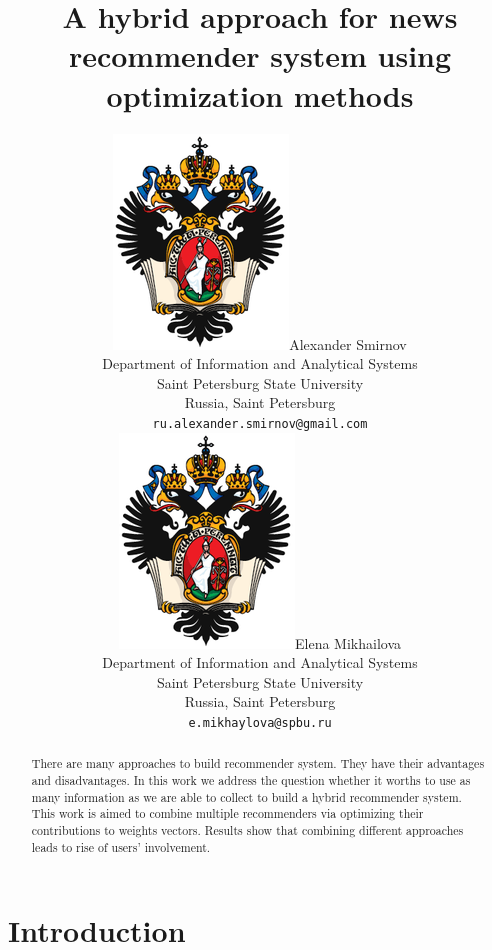 \documentclass{article}
\title{A hybrid approach for news recommender system using optimization methods}
\author{
    {\includegraphics[scale=0.07]{./images/spbu.png}\hspace{1mm}Alexander Smirnov}\\
	Department of Information and Analytical Systems\\
	Saint Petersburg State University\\
	Russia, Saint Petersburg\\
	\texttt{ru.alexander.smirnov@gmail.com} \\
	\And
	{\includegraphics[scale=0.07]{images/spbu.png}\hspace{1mm}Elena Mikhailova} \\
	Department of Information and Analytical Systems\\
	Saint Petersburg State University\\
	Russia, Saint Petersburg\\
	\texttt{e.mikhaylova@spbu.ru} \\
}
\begin{document}
    \maketitle

    \begin{abstract}

        There are many approaches \citep{approaches} to build recommender system. They have their advantages and disadvantages. In this work we address the question whether it worths to use as many information as we are able to collect to build a hybrid recommender system. This work is aimed to combine multiple recommenders via optimizing their contributions to weights vectors. Results show that combining different approaches leads to rise of users' involvement.

    \end{abstract}




    \section{Introduction}






    
      
\end{document}
